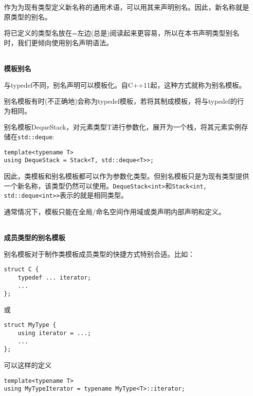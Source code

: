 作为为现有类型定义新名称的通用术语，可以用其来声明别名。因此，新名称就是原类型的别名。

将已定义的类型名放在=左边(总是)阅读起来更容易，所以在本书声明类型别名时，我们更倾向使用别名声明语法。

\hspace*{\fill} \\ %
\noindent
\textbf{模板别名}

与typedef不同，别名声明可以模板化。自C++11起，这种方式就称为别名模板。

\begin{tcolorbox}[colback=webgreen!5!white,colframe=webgreen!75!black]
\hspace*{0.75cm}别名模板有时(不正确地)会称为typedef模板，若将其制成模板，将与typedef的行为相同。
\end{tcolorbox}

别名模板DequeStack，对元素类型T进行参数化，展开为一个栈，将其元素实例存储在\texttt{std::deque}:

\begin{lstlisting}[style=styleCXX]
template<typename T>
using DequeStack = Stack<T, std::deque<T>>;
\end{lstlisting}

因此，类模板和别名模板都可以作为参数化类型。但别名模板只是为现有类型提供一个新名称，该类型仍然可以使用。\texttt{DequeStack<int>}和\texttt{Stack<int, std::deque<int>>}表示的就是相同类型。

通常情况下，模板只能在全局/命名空间作用域或类声明内部声明和定义。

\hspace*{\fill} \\ %
\noindent
\textbf{成员类型的别名模板}

别名模板对于制作类模板成员类型的快捷方式特别合适。比如：

\begin{lstlisting}[style=styleCXX]
struct C {
	typedef ... iterator;
	...
};
\end{lstlisting}

或

\begin{lstlisting}[style=styleCXX]
struct MyType {
	using iterator = ...;
	...
};
\end{lstlisting}

可以这样的定义

\begin{lstlisting}[style=styleCXX]
template<typename T>
using MyTypeIterator = typename MyType<T>::iterator;
\end{lstlisting}

